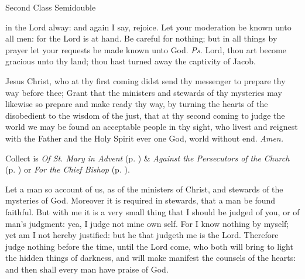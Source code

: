 \begin{inhead}
{Second Class Semidouble}
\end{inhead}

\properantiphonfix

\introit
{} in the Lord alway: and again I say, rejoice. Let your moderation be known unto all men: for the Lord is at hand. Be careful for nothing; but in all things by prayer let your requests be made known unto God. \textit{Ps.} Lord, thou art become gracious unto thy land; thou hast turned away the captivity of Jacob.

\vspace{-1ex}

\collect
{} Jesus Christ, who at thy first coming didst send thy messenger to prepare thy way before thee; Grant that the ministers and stewards of thy mysteries may likewise so prepare and make ready thy way, by turning the hearts of the disobedient to the wisdom of the just, that at thy second coming to judge the world we may be found an acceptable people in thy sight, who livest and reignest with the Father and the Holy Spirit ever one God, world without end. \textit{Amen.}
\begin{rubric}
     Collect is \emph{Of St. Mary in Advent} (p. \pageref{SPMaryInAdvent}) \&  \emph{Against the Persecutors of the Church} (p. \pageref{SPAgainst}) or \emph{For the Chief Bishop} (p. \pageref{SPChiefBishop}).
\end{rubric}
 Let a man so account of us, as of the ministers of Christ, and stewards of the mysteries of God. Moreover it is required in stewards, that a man be found faithful. But with me it is a very small thing that I should be judged of you, or of man's judgment: yea, I judge not mine own self. For I know nothing by myself; yet am I not hereby justified: but he that judgeth me is the Lord. Therefore judge nothing before the time, until the Lord come, who both will bring to light the hidden things of darkness, and will make manifest the counsels of the hearts: and then shall every man have praise of God.


